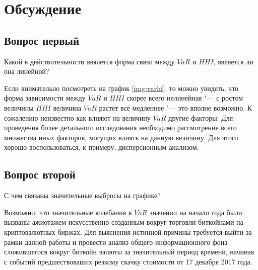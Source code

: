 \documentclass[12pt]{article}
\begin{document}
\section{Обсуждение}

\subsection{Вопрос первый}

Какой в действительности явялется форма связи между $VaR$ и $HHI$, является ли она линейной?

\par Если внимательно посмотреть на график \ref{img:varhf}, то можно увидеть, что форма зависимости между $VaR$ и $HHI$ скорее всего нелинейная "--- с ростом величины $HHI$ величина $VaR$ растёт всё медленнее "--- это вполне возможно. К сожалению неизвестно как влияют на величину $VaR$ другие факторы. Для проведения более детального исследования необходимо рассмотрение всего множества иных факторов, могущих влиять на данную величину. Для этого хорошо воспользоваться, к примеру, дисперсионным анализом.

\subsection{Вопрос второй}
С чем связаны значительные выбросы на графике?
\par Возможно, что значительные колебания в $VaR$ значении на начало года были вызваны ажиотажем искусственно созданным вокруг торговли биткойнами на криптовалютных биржах\cite{Dembinskaya}. Для выяснения истинной причины требуется выйти за рамки данной работы и провести анализ общего информационного фона сложившегося вокруг биткойн валюты за значительный период времени, начиная с событий предшествоваших резкому скачку стоимости от 17 декабря 2017 года.
 
 

\end{document}
